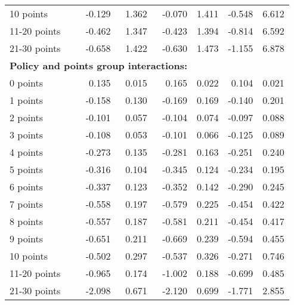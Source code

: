 \begin{table}
\begin{tabular}{l r r r r r r}
10 points  & -0.129  &  1.362  & -0.070  &  1.411  & -0.548  &  6.612   \\ 
 
11-20 points  & -0.462  &  1.347  & -0.423  &  1.394  & -0.814  &  6.592   \\ 
 
21-30 points  & -0.658  &  1.422  & -0.630  &  1.473  & -1.155  &  6.878   \\ 
 

\hline 
 
\multicolumn{4}{l}{\textbf{Policy and points group interactions:}}  \\ 
 
0 points  &  0.135  &  0.015  &  0.165  &  0.022  &  0.104  &  0.021   \\ 
 
1 points  & -0.158  &  0.130  & -0.169  &  0.169  & -0.140  &  0.201   \\ 
 
2 points  & -0.101  &  0.057  & -0.104  &  0.074  & -0.097  &  0.088   \\ 
 
3 points  & -0.108  &  0.053  & -0.101  &  0.066  & -0.125  &  0.089   \\ 
 
4 points  & -0.273  &  0.135  & -0.281  &  0.163  & -0.251  &  0.240   \\ 
 
5 points  & -0.316  &  0.104  & -0.345  &  0.124  & -0.234  &  0.195   \\ 
 
6 points  & -0.337  &  0.123  & -0.352  &  0.142  & -0.290  &  0.245   \\ 
 
7 points  & -0.558  &  0.197  & -0.579  &  0.225  & -0.454  &  0.422   \\ 
 
8 points  & -0.557  &  0.187  & -0.581  &  0.211  & -0.454  &  0.417   \\ 
 
9 points  & -0.651  &  0.211  & -0.669  &  0.239  & -0.594  &  0.455   \\ 
 
10 points  & -0.502  &  0.297  & -0.537  &  0.326  & -0.271  &  0.746   \\ 
 
11-20 points  & -0.965  &  0.174  & -1.002  &  0.188  & -0.699  &  0.485   \\ 
 
21-30 points  & -2.098  &  0.671  & -2.120  &  0.699  & -1.771  &  2.855   \\ 
 

\end{tabular}
\end{table}
